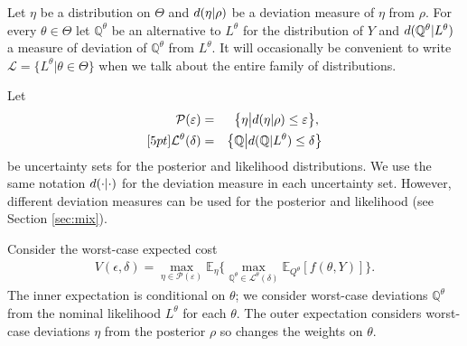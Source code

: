 \documentclass[10pt,a4paper]{amsart}
\numberwithin{equation}{section}
\numberwithin{theorem}{section}
\numberwithin{table}{section}
\numberwithin{figure}{section}
\begin{document}
Let $\eta$ be a distribution  on $\Theta$  and ${\rm d}( \eta | \rho)$ be a deviation measure of $\eta$ from $\rho$. For every $\theta\in\Theta$ let ${\mathbb Q}^\theta$ be an alternative to $L^\theta$ for the distribution of  $Y$ and ${\rm d}({\mathbb Q}^\theta| L^\theta)$ a measure of deviation of ${\mathbb Q}^\theta$ from $L^\theta$. It will occasionally be convenient to write ${\mathcal L} = \{ L^\theta| \theta\in\Theta\}$ when we talk about the entire family of distributions.




Let
\begin{eqnarray}
 \label{eq:uncertainty-set}
{\mathcal P}(\varepsilon) & = & \big\{ \eta\big\vert {\rm d}(\eta|\rho)\leq \varepsilon\big\},\; \\  [5pt]
{\mathcal L}^\theta(\delta) & =& \big\{{\mathbb Q}\big\vert {\rm d}({\mathbb Q}|L^\theta)\leq\delta\big\} \nonumber
\end{eqnarray}
be uncertainty sets for the posterior and likelihood distributions. We use the same notation ${\rm d}(\cdot|\cdot)$ for the deviation measure in each uncertainty set. However, different deviation measures can be used for the posterior and likelihood (see Section \ref{sec:mix}).

Consider the worst-case expected cost
\begin{eqnarray}
V(\epsilon, \delta) 
= \max_{\eta \in {\mathcal P}(\varepsilon)} {\mathbb E}_\eta \Big\{\max_{{\mathbb Q}^\theta \in {\mathcal L}^\theta(\delta)} {\mathbb E}_{Q^\theta} [f(\theta, Y)] \Big\}.
\label{eq:wc_Bayes}
\end{eqnarray}
The inner expectation is conditional on $\theta$; we consider worst-case deviations ${\mathbb Q}^\theta$ from the nominal likelihood $L^\theta$ for each $\theta$. The outer expectation considers worst-case deviations $\eta$ from the posterior $\rho$ so changes the weights on $\theta$. 
\end{document}
